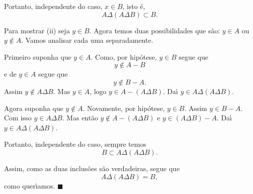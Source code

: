 \documentclass[12pt]{exam}
\renewcommand{\qedsymbol}{$\blacksquare$}
\begin{document}
    Portanto, independente do caso, $x \in B$, isto \'e,
    \[
        A \Delta (A \Delta B) \subset B.
    \]

    Para mostrar (ii) seja $y \in B$. Agora temos duas possibilidades que s\~ao: $y \in A$ ou $y \notin A$. Vamos analisar cada uma separadamente.

    Primeiro suponha que $y \in A$. Como, por hip\'otese, $y \in B$ segue que
    \[
        y \notin A - B
    \]
    e de $y \in A$ segue que
    \[
        y \notin B - A.
    \]
    Assim $y \notin A \Delta B$. Mas $y \in A$, logo $y \in A - (A \Delta B)$. Da{\'\i} $y \in A \Delta (A \Delta B)$.

    Agora suponha que $y \notin A$. Novamente, por hip\'otese, $y \in B$. Assim $y \in B - A$. Com isso $y \in A \Delta B$. Mas ent\~ao $y \notin A - (A \Delta B)$ e $y \in (A \Delta B) - A$. Da{\'\i} $y \in A \Delta (A \Delta B)$.

    Portanto, independente do caso, sempre temos
    \[
        B \subset A \Delta (A \Delta B).
    \]

    Assim, como as duas inclus\~oes s\~ao verdadeiras, segue que
    \[
        A \Delta (A \Delta B) = B,
    \]
    como quer{\'\i}amos. \hspace{.1cm} \qedsymbol
\end{document}
